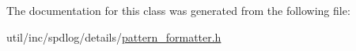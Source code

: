 The documentation for this class was generated from the following file\+:\begin{DoxyCompactItemize}
\item 
util/inc/spdlog/details/\hyperlink{pattern__formatter_8h}{pattern\+\_\+formatter.\+h}\end{DoxyCompactItemize}
